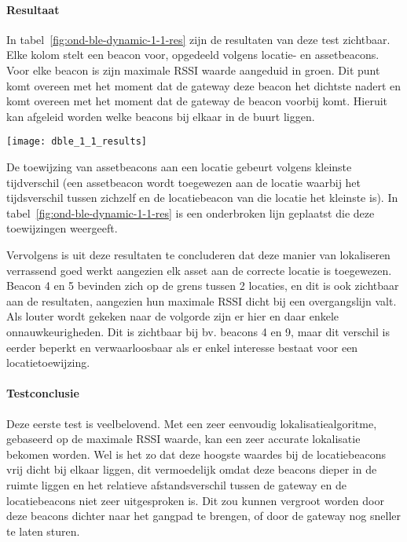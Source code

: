 \paragraph{Resultaat}
\begin{minipage}{0.42\textwidth}
In tabel~\ref{fig:ond-ble-dynamic-1-1-res} zijn de resultaten van deze test zichtbaar. Elke kolom stelt een beacon voor, opgedeeld volgens locatie- en assetbeacons. Voor elke beacon is zijn maximale RSSI waarde aangeduid in groen. Dit punt komt overeen met het moment dat de gateway deze beacon het dichtste nadert en komt overeen met het moment dat de gateway de beacon voorbij komt. Hieruit kan afgeleid worden welke beacons bij elkaar in de buurt liggen. 
\end{minipage}
\hfill
\begin{minipage}{0.55\textwidth}
	\texttt{[image: dble\_1\_1\_results]}
	\label{fig:ond-ble-dynamic-1-1-res}
\end{minipage}

De toewijzing van assetbeacons aan een locatie gebeurt volgens kleinste tijdverschil (een assetbeacon wordt toegewezen aan de locatie waarbij het tijdsverschil tussen zichzelf en de locatiebeacon van die locatie het kleinste is). In tabel~\ref{fig:ond-ble-dynamic-1-1-res} is een onderbroken lijn geplaatst die deze toewijzingen weergeeft.

Vervolgens is uit deze resultaten te concluderen dat deze manier van lokaliseren verrassend goed werkt aangezien elk asset aan de correcte locatie is toegewezen. Beacon 4 en 5 bevinden zich op de grens tussen 2 locaties, en dit is ook zichtbaar aan de resultaten, aangezien hun maximale RSSI dicht bij een overgangslijn valt. Als louter wordt gekeken naar de volgorde zijn er hier en daar enkele onnauwkeurigheden. Dit is zichtbaar bij bv. beacons 4 en 9, maar dit verschil is eerder beperkt en verwaarloosbaar als er enkel interesse bestaat voor een locatietoewijzing.

\paragraph{Testconclusie}
Deze eerste test is veelbelovend. Met een zeer eenvoudig lokalisatiealgoritme, gebaseerd op de maximale RSSI waarde, kan een zeer accurate lokalisatie bekomen worden. Wel is het zo dat deze hoogste waardes bij de locatiebeacons vrij dicht bij elkaar liggen, dit vermoedelijk omdat deze beacons dieper in de ruimte liggen en het relatieve afstandsverschil tussen de gateway en de locatiebeacons niet zeer uitgesproken is. Dit zou kunnen vergroot worden door deze beacons dichter naar het gangpad te brengen, of door de gateway nog sneller te laten sturen.

